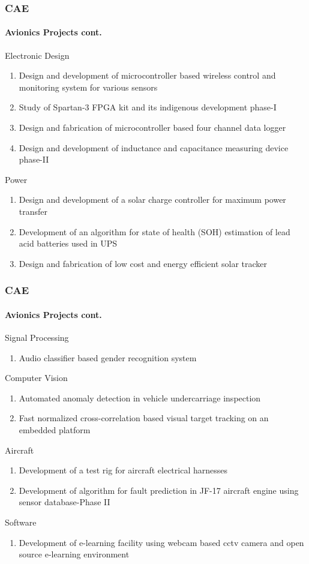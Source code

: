 \begin{frame}
\frametitle{CAE}
\framesubtitle{Avionics Projects \tiny cont.}
\mypagenum{}
Electronic Design
\begin{enumerate}\scriptsize
\item Design and development of microcontroller based wireless control and monitoring system for various sensors
\item Study of Spartan-3 FPGA kit and its indigenous development phase-I
\item Design and fabrication of microcontroller based four channel data logger
\item Design and development of inductance and capacitance measuring device phase-II
\end{enumerate}
Power
\begin{enumerate}\scriptsize
\item Design and development of a solar charge controller for maximum power transfer
\item Development of an algorithm for state of health (SOH) estimation of lead acid batteries used in UPS
\item Design and fabrication of low cost and energy efficient solar tracker
\end{enumerate}
\end{frame}



\begin{frame}
\frametitle{CAE}
\framesubtitle{Avionics Projects \tiny cont.}
\mypagenum{}
Signal Processing
\begin{enumerate}\scriptsize
\item {\color{blue}Audio classifier based gender recognition system}
\end{enumerate}
Computer Vision
\begin{enumerate}\scriptsize
\item {\color{blue}Automated anomaly detection in vehicle undercarriage inspection}
\item Fast normalized cross-correlation based visual target tracking on an embedded platform
\end{enumerate}
Aircraft
\begin{enumerate}\scriptsize
\item Development of a test rig for aircraft electrical harnesses
\item Development of algorithm for fault prediction in JF-17 aircraft engine using sensor database-Phase II
\end{enumerate}
Software
\begin{enumerate}\scriptsize
\item Development of e-learning facility using webcam based cctv camera and open source e-learning environment
\end{enumerate}
\end{frame}



